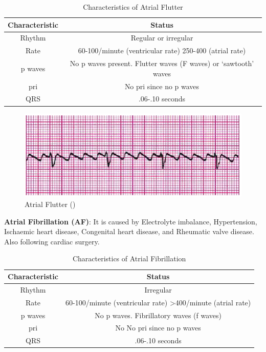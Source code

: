 \begin{table}[H]
\begin{center}
\begin{tabular}{||c || c||}
 \hline
\textbf{Characteristic} & \textbf{Status} \\ [0.4ex] 
 \hline\hline
 Rhythm & Regular or irregular \\
\hline
Rate & 60-100/minute (ventricular rate) 250-400 (atrial rate)\\
\hline
p waves & No p waves present. Flutter waves (F waves) or ‘sawtooth’ waves \\
\hline
pri & No pri since no p waves \\
\hline
QRS & .06-.10 seconds \\
\hline\hline
\end{tabular}
\end{center}
\caption{Characteristics of Atrial Flutter}
\label{table:AFL_characteristics}
\end{table}

 \begin{figure}[H]
\centering
\includegraphics[scale=0.9]{img/AFL.png}
\caption{Atrial Flutter (\cite{arryth_types})}
\label{fig:AFL}
\end{figure}

\textbf{Atrial Fibrillation (AF)}: It is caused by Electrolyte imbalance, Hypertension, Ischaemic heart disease, Congenital heart disease, and Rheumatic valve disease. Also following cardiac surgery.

\begin{table}[H]
\begin{center}
\begin{tabular}{||c || c||}
 \hline
\textbf{Characteristic} & \textbf{Status} \\ [0.4ex] 
 \hline\hline
 Rhythm & Irregular \\
\hline
Rate & 60-100/minute (ventricular rate) >400/minute (atrial rate)\\
\hline
p waves & No p waves. Fibrillatory waves (f waves) \\
\hline
pri & No No pri since no p waves \\
\hline
QRS & .06-.10 seconds \\
\hline\hline
\end{tabular}
\end{center}
\caption{Characteristics of Atrial Fibrillation}
\label{table:AF_characteristics}
\end{table}

